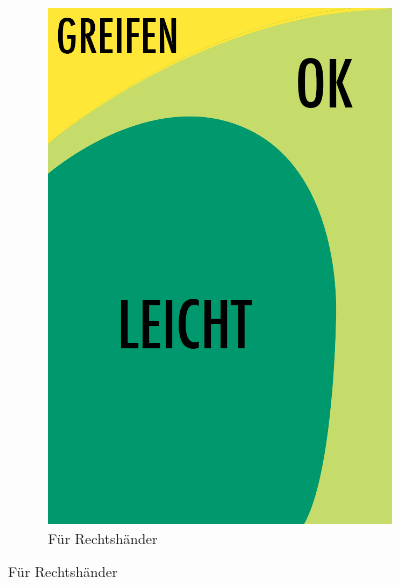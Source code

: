 \begin{figure}
	\centering
	\begin{subfigure}[b]{0.3\textwidth}
		\centering
			\includegraphics[width=1\textwidth]{img/anordungDerElementeSimple.png}
			\caption{Für Rechtshänder}\label{fig:rechtsPositioning}
			

\end{subfigure}
\end{figure}
